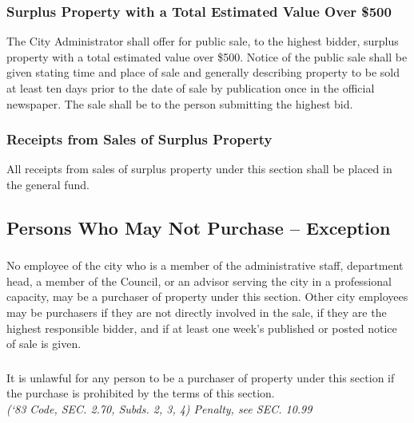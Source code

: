 \subsubsection{Surplus Property with a Total Estimated Value Over \$500}
The City Administrator shall offer for public sale, to the highest bidder, surplus property with a total estimated value over \$500.  Notice of the public sale shall be given stating time and place of sale and generally describing property to be sold at least ten days prior to the date of sale by publication once in the official newspaper.  The sale shall be to the person submitting the highest bid.
\subsubsection{Receipts from Sales of Surplus Property}
All receipts from sales of surplus property under this section shall be placed in the general fund.
\subsection{Persons Who May Not Purchase -- Exception}
\subsubsection{}
No employee of the city who is a member of the administrative staff, department head, a member of the Council, or an advisor serving the city in a professional capacity, may be a purchaser of property under this section.  Other city employees may be purchasers if they are not directly involved in the sale, if they are the highest responsible bidder, and if at least one week’s published or posted notice of sale is given.
\subsubsection{}
It is unlawful for any person to be a purchaser of property under this section if the purchase is prohibited by the terms of this section.\\
\emph{(‘83 Code, SEC. 2.70, Subds. 2, 3, 4) Penalty, see SEC. 10.99}
